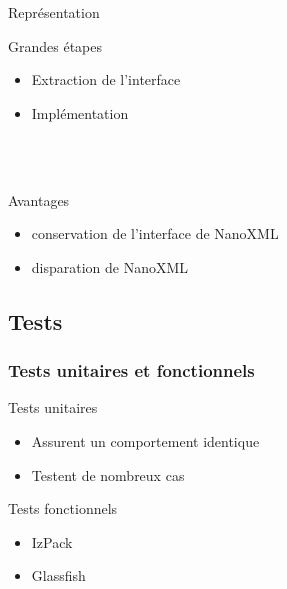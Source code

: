 \begin{frame}
\begin{minipage}[c]{.3\linewidth}
\begin{beamerboxesrounded}[shadow=true]{Représentation}
\end{beamerboxesrounded}
\end{minipage}
\hfill
\begin{minipage}[c]{.6\linewidth}
\begin{minipage}[c]{\linewidth}
\begin{beamerboxesrounded}[shadow=true]{Grandes étapes}
\begin{itemize}
	\item Extraction de l'interface
	\item Implémentation
\end{itemize}
\end{beamerboxesrounded}
\end{minipage}
~\\
~\\
\begin{minipage}[c]{\linewidth}
\begin{beamerboxesrounded}[shadow=true]{Avantages}
\begin{itemize}
	\item conservation de l'interface de NanoXML
	\item disparation de NanoXML
\end{itemize}
\end{beamerboxesrounded}
\end{minipage}
\end{minipage}
\end{frame}
\subsection{Tests}
\begin{frame}\frametitle{Tests unitaires et fonctionnels}
\begin{minipage}[c]{.9\linewidth}
\begin{beamerboxesrounded}[shadow=true]{Tests unitaires}
\begin{itemize}
	\item Assurent un comportement identique
	\item Testent de nombreux cas
\end{itemize}
\end{beamerboxesrounded}
\end{minipage}
\vfill
\begin{minipage}[c]{.9\linewidth}
\begin{beamerboxesrounded}[shadow=true]{Tests fonctionnels}
\begin{itemize}
	\item IzPack
	\item Glassfish
\end{itemize}
\end{beamerboxesrounded}
\end{minipage}
\end{frame}

